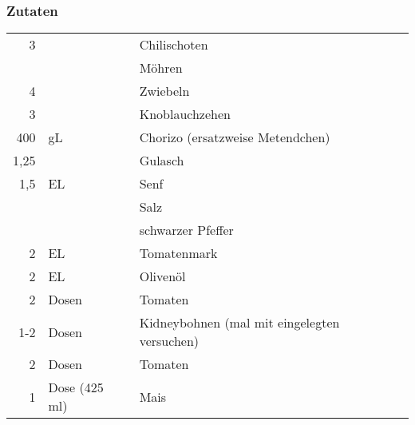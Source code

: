 \subsubsection*{Zutaten}
\begin{tabular}{rll}
	   3 &               & Chilischoten                                 \\
	     &               & Möhren                                       \\
	   4 &               & Zwiebeln                                     \\
	   3 &               & Knoblauchzehen                               \\
	 400 & gL            & Chorizo (ersatzweise Metendchen)             \\
	1,25 &               & Gulasch                                      \\
	 1,5 & EL            & Senf                                         \\
	     &               & Salz                                         \\
	     &               & schwarzer Pfeffer                            \\
	   2 & EL            & Tomatenmark                                  \\
	   2 & EL            & Olivenöl                                     \\
	   2 & Dosen         & Tomaten                                      \\
	 1-2 & Dosen         & Kidneybohnen (mal mit eingelegten versuchen) \\
	   2 & Dosen         & Tomaten                                      \\
	   1 & Dose (425 ml) & Mais
\end{tabular} 
